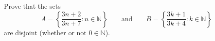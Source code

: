 Prove that the sets
\[A=\left\{\dfrac{3n+2}{3n+7}:n\in\mathbb N\right\}\qquad\text{and}\qquad B=\left\{\dfrac{3k+1}{3k+4}:k\in\mathbb N\right\}\]
are disjoint (whether or not $0\in\mathbb N$).
